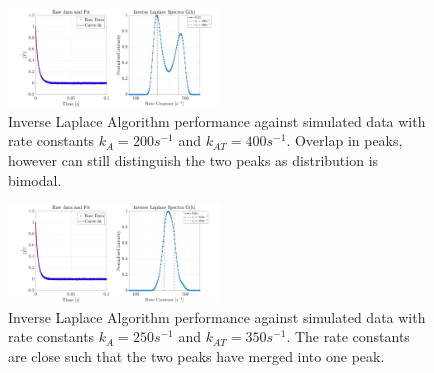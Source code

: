 \begin{figure}[H]
    \centering
    \includegraphics[width = 0.5\textwidth]{img/Inv_laplace_200_400.png}
    \caption{Inverse Laplace Algorithm performance against simulated data with rate constants $k_{A} = 200s^{-1}$ and $k_{AT} = 400s^{-1}$. Overlap in peaks, however can still distinguish the two peaks as distribution is bimodal.}
    \label{multiexp_3}
\end{figure}
\begin{figure}[H]
    \centering
    \includegraphics[width = 0.5\textwidth]{img/Inv_laplace_250_350.png}
    \caption{Inverse Laplace Algorithm performance against simulated data with rate constants $k_{A} = 250s^{-1}$ and $k_{AT} = 350s^{-1}$. The rate constants are close such that the two peaks have merged into one peak.}
    \label{multiexp_4}
\end{figure}
